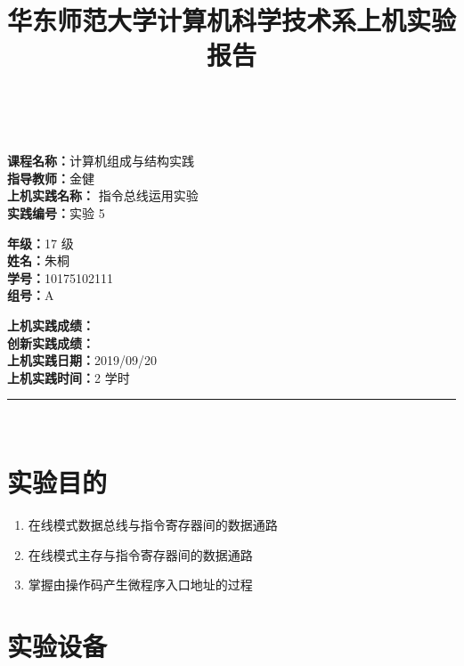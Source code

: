 \documentclass[a4paper,10pt,UTF8]{paper}
\title{华东师范大学计算机科学技术系上机实验报告}
\numberwithin{equation}{section}
\numberwithin{figure}{section}
\begin{document}
\pagestyle{fancy}
\lhead{}
\rhead{}
\makeatletter
\def\headrule{{\if@fancyplain\let\headrulewidth\plainheadrulewidth\fi%
\color{gray}\hrule\@height 0.2pt\@width\headwidth}
  \vspace{6mm}}
\makeatother

\newcommand{\HRule}{\rule{\linewidth}{1mm}}
\newcommand{\dai}{\textbf{Dais-CMX16$^+$}}

{ \\ [0.8cm]

\small{
  \begin{minipage}[t]{.32\linewidth}
    \textbf{课程名称：}计算机组成与结构实践\\
    \textbf{指导教师：}金健\\
    \textbf{上机实践名称：} 指令总线运用实验\\
    \textbf{实践编号：}实验 5
  \end{minipage}
  \begin{minipage}[t]{.32\linewidth}
    \textbf{年级：}17 级\\
    \textbf{姓名：}朱桐\\
    \textbf{学号：}10175102111\\
    \textbf{组号：}A
  \end{minipage} 
  \begin{minipage}[t]{.32\linewidth}
    \textbf{上机实践成绩：} \\
    \textbf{创新实践成绩：} \\
    \textbf{上机实践日期：}2019/09/20\\
    \textbf{上机实践时间：}2 学时\\
  \end{minipage}
}
\HRule \\[0.5cm]
}
\section{实验目的}

\begin{enumerate}
    \item 在线模式数据总线与指令寄存器间的数据通路
    \item 在线模式主存与指令寄存器间的数据通路
    \item 掌握由操作码产生微程序入口地址的过程
\end{enumerate}

\section{实验设备}
\end{document}
